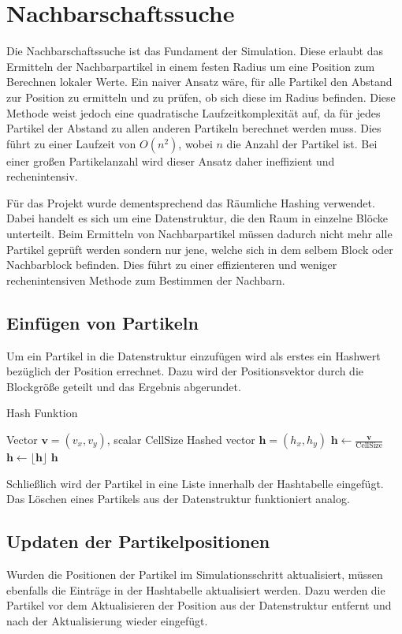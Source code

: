 \documentclass[a4paper, 12pt]{article}
\begin{document}
\section{Nachbarschaftssuche} \label{Kap:NachbarschaftsSuche}
Die Nachbarschaftssuche ist das Fundament der Simulation. Diese erlaubt das Ermitteln der Nachbarpartikel in einem festen Radius um eine Position zum Berechnen lokaler Werte. Ein naiver Ansatz wäre, für alle Partikel den Abstand zur Position zu ermitteln und zu prüfen, ob sich diese im Radius befinden. Diese Methode weist jedoch eine quadratische Laufzeitkomplexität auf, da für jedes Partikel der Abstand zu allen anderen Partikeln berechnet werden muss. Dies führt zu einer Laufzeit von $O(n^2)$, wobei $n$ die Anzahl der Partikel ist. Bei einer großen Partikelanzahl wird dieser Ansatz daher ineffizient und rechenintensiv.

Für das Projekt wurde dementsprechend das Räumliche Hashing verwendet. Dabei handelt es sich um eine Datenstruktur, die den Raum in einzelne Blöcke unterteilt. Beim Ermitteln von Nachbarpartikel müssen dadurch nicht mehr alle Partikel geprüft werden sondern nur jene, welche sich in dem selbem Block oder Nachbarblock befinden. Dies führt zu einer effizienteren und weniger rechenintensiven Methode zum Bestimmen der Nachbarn.

\subsection{Einfügen von Partikeln}
Um ein Partikel in die Datenstruktur einzufügen wird als erstes ein Hashwert bezüglich der Position errechnet. Dazu wird der Positionsvektor durch die Blockgröße geteilt und das Ergebnis abgerundet.
\begin{algorithm}[H]
	\caption{Hash Funktion}
	\begin{algorithmic}[1]
		\Require Vector $\mathbf{v} = (v_x, v_y)$, scalar $\text{CellSize}$
		\Ensure Hashed vector $\mathbf{h} = (h_x, h_y)$
		\State $\mathbf{h} \leftarrow \frac{\mathbf{v}}{\text{CellSize}}$
		\State $\mathbf{h} \leftarrow \lfloor \mathbf{h} \rfloor$
		\Return $\mathbf{h}$
	\end{algorithmic}
\end{algorithm}

Schließlich wird der Partikel in eine Liste innerhalb der Hashtabelle eingefügt. Das Löschen eines Partikels aus der Datenstruktur funktioniert analog.

\subsection{Updaten der Partikelpositionen}
Wurden die Positionen der Partikel im Simulationsschritt aktualisiert, müssen ebenfalls die Einträge in der Hashtabelle aktualisiert werden. Dazu werden die Partikel vor dem Aktualisieren der Position aus der Datenstruktur entfernt und nach der Aktualisierung wieder eingefügt. 
\end{document}
